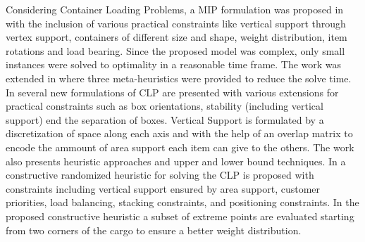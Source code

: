 \citep{Calzavara2021}

Considering Container Loading Problems, a MIP formulation was proposed in \citep{paquay2016mixed} with the inclusion of various practical constraints like vertical support through vertex support, containers of different size and shape, weight distribution, item rotations and load bearing.
Since the proposed model was complex, only small instances were solved to optimality in a reasonable time frame. The work was extended in \citep{paquay2007} where three meta-heuristics were provided to reduce the solve time.
In \citep{kurpel2020exact} several new formulations of CLP are presented with various extensions for practical constraints such as box orientations, stability (including vertical support) end the separation of boxes.
Vertical Support is formulated by a discretization of space along each axis and with the help of an overlap matrix to encode the ammount of area support each item can give to the others.
The work also presents heuristic approaches and upper and lower bound techniques.
\citep{Alonso2020} %
In \citep{GAJDA2022102559} a constructive randomized heuristic for solving the CLP is proposed with constraints including vertical support ensured by area support, customer priorities, load balancing, stacking constraints, and positioning constraints.
In the proposed constructive heuristic a subset of extreme points are evaluated starting from two corners of the cargo to ensure a better weight distribution.
